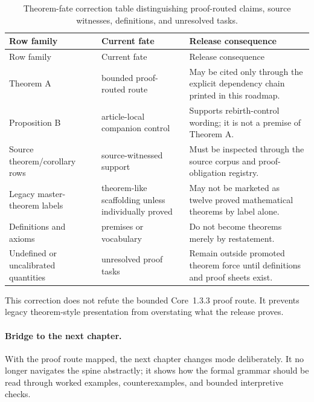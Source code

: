 \begin{octablescope}
\begin{longtable}{@{}L{0.22\textwidth}L{0.24\textwidth}L{0.44\textwidth}@{}}
\caption{Theorem-fate correction table distinguishing proof-routed claims, source witnesses, definitions, and unresolved tasks.}\label{tab:r013-theorem-fate-correction}\\
\toprule
Row family & Current fate & Release consequence \\
\midrule
\endfirsthead
\toprule
Row family & Current fate & Release consequence \\
\midrule
\endhead
Theorem A & bounded proof-routed route & May be cited only through the explicit dependency chain printed in this roadmap. \\
Proposition B & article-local companion control & Supports rebirth-control wording; it is not a premise of Theorem A. \\
Source theorem/corollary rows & source-witnessed support & Must be inspected through the source corpus and proof-obligation registry. \\
Legacy master-theorem labels & theorem-like scaffolding unless individually proved & May not be marketed as twelve proved mathematical theorems by label alone. \\
Definitions and axioms & premises or vocabulary & Do not become theorems merely by restatement. \\
Undefined or uncalibrated quantities & unresolved proof tasks & Remain outside promoted theorem force until definitions and proof sheets exist. \\
\bottomrule
\end{longtable}
\end{octablescope}

This correction does not refute the bounded Core~1.3.3 proof route. It prevents
legacy theorem-style presentation from overstating what the release proves.

\paragraph{Bridge to the next chapter.}
With the proof route mapped, the next chapter changes mode deliberately. It no
longer navigates the spine abstractly; it shows how the formal grammar should
be read through worked examples, counterexamples, and bounded interpretive
checks.

\clearpage
